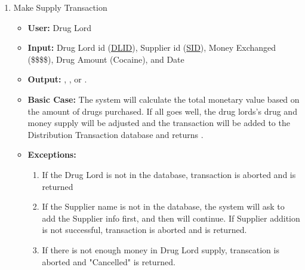 \documentclass[11pt, oneside]{article}   	%
\theoremstyle{definition}
\theoremstyle{remark}
\begin{document}
\begin{enumerate}
			
	\item Make Supply Transaction
	\begin{itemize}
			\item \textbf{User:} Drug Lord
			\item \textbf{Input:} Drug Lord id (\underline{DLID}), Supplier id (\underline{SID}), Money Exchanged (\$\$\$\$), Drug Amount (Cocaine), and Date
			\item \textbf{Output:} , , or .
			\item \textbf{Basic Case:} The system will calculate the total monetary value based on the amount of drugs purchased. If all goes well, the drug lords's drug and money supply will be adjusted and the transaction will be added to the Distribution Transaction database and returns .
			\item \textbf{Exceptions:}
			\begin{enumerate}
				\item If the Drug Lord is not in the database, transaction is aborted and  is returned
				\item If the Supplier name is not in the database, the system will ask to add the Supplier info first, and then will continue. If Supplier addition is not successful, transaction is aborted and  is returned.
				\item If there is not enough money in Drug Lord supply, transcation is aborted and "Cancelled" is returned.
			\end{enumerate}
		\end{itemize}	
		

\end{enumerate}
\end{document}
